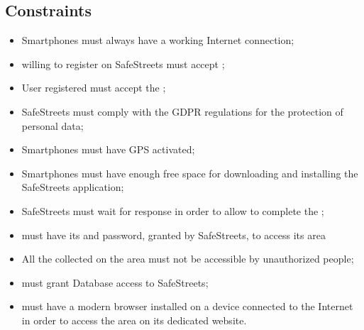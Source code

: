 \documentclass[../../rasd.tex]{subfiles}
\begin{document}
 \subsection{Constraints}
 	\begin{itemize}
 		\item Smartphones must always have a working Internet connection;
 		\item {} willing to register on SafeStreets must accept ;
 		\item User registered must accept the ;
 		\item SafeStreets must comply with the GDPR regulations for the protection of  personal data;
 		\item Smartphones must have GPS activated;
 		\item Smartphones must have enough free space for downloading and installing the SafeStreets application;
 		\item SafeStreets must wait for  response in order to allow  to complete the ;
 		\item {} must have its  and password, granted by SafeStreets, to access its  area
 		\item All the collected  on the  area must not be accessible by unauthorized people;
 		\item {} must grant  Database access to SafeStreets;
 		\item {} must have a modern browser installed on a device connected to the Internet in order to access the  area on its dedicated website. 

 	\end{itemize}
\end{document}
